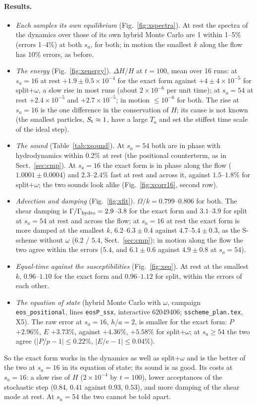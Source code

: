 \documentclass[11pt,aps,preprint,nofootinbib,superscriptaddress,tightenlines]{revtex4-2}
\def\Sect#1{Sect.~\ref{#1}}
\def\Fig#1{Fig.~\ref{#1}}
\let\oldparagraph\paragraph
\renewcommand{\paragraph}{\par\bigskip\oldparagraph}
\begin{document}
\paragraph{Results.}
\begin{itemize}
\item \emph{Each samples its own equilibrium} (\Fig{fig:xspectra}).  At rest the spectra of the dynamics over those of its own hybrid Monte Carlo are 1 within
  1--5\% (errors 1--4\%) at both $s_a$, for both; in motion the smallest $k$ along the flow has 10\% errors, as before.
\item \emph{The energy} (\Fig{fig:xenergy}).  $\Delta H/H$ at $t=100$, mean over 16 runs: at $s_a=16$ at rest $+1.9\pm0.5\times10^{-4}$ for the exact form against
  $+4\pm4\times10^{-5}$ for split$+\omega$, a slow rise in most runs (about $2\times10^{-6}$ per unit time); at $s_a=54$ at rest $+2.4\times10^{-5}$ and
  $+2.7\times10^{-5}$; in motion $\le10^{-6}$ for both.  The rise at $s_a=16$ is the one difference in the conservation of $H$; its cause is not known
  (the smallest particles, $S_{\rm t}\approx1$, have a large $T_a$ and set the stiffest time scale of the ideal step).
\item \emph{The sound} (Table~\ref{tab:xsound}).  At $s_a=54$ both are in phase with hydrodynamics within 0.2\% at rest (the positional counterterm, as in
  \Sect{sec:cmp}).  At $s_a=16$ the exact form is in phase along the flow ($1.0001\pm0.0004$) and $2.3$--$2.4\%$ fast at rest and across it, against
  $1.5$--$1.8\%$ for split$+\omega$; the two sounds look alike (\Fig{fig:xcorr16}, second row).
\item \emph{Advection and damping} (\Fig{fig:xfit}).  $\Omega/k=0.799$--$0.806$ for both.  The shear damping is $\Gamma/\Gamma_{\rm hydro}=2.9$--$3.8$ for the
  exact form and $3.1$--$3.9$ for split at $s_a=54$ at rest and across the flow; at $s_a=16$ at rest the exact form is more damped at the smallest $k$,
  $6.2$--$6.3\pm0.4$ against $4.7$--$5.4\pm0.3$, as the S-scheme without $\omega$ ($6.2$ / $5.4$, \Sect{sec:cmp}); in motion along the flow the two agree within the
  errors ($5.4$, and $6.1\pm0.6$ against $4.9\pm0.8$ at $s_a=54$).
\item \emph{Equal-time against the susceptibilities} (\Fig{fig:xeq}).  At rest at the smallest $k$, $0.96$--$1.10$ for the exact form and $0.96$--$1.12$ for split,
  within the errors of each other.
\item \emph{The equation of state} (hybrid Monte Carlo with $\omega$, campaign \texttt{eos\_positional}, lines \texttt{eosP\_ssx}, interactive 62049406;
  \texttt{sscheme\_plan.tex}, X5).  The raw error at $s_a=16$, $h/a=2$, is smaller for the exact form: $P$ $+2.96\%$, $E$ $+3.73\%$, against $+4.36\%$, $+5.58\%$
  for split$+\omega$; at $s_a\ge54$ the two agree ($|P/p-1|\le0.22\%$, $|E/e-1|\le0.04\%$).
\end{itemize}
So the exact form works in the dynamics as well as split$+\omega$ and is the better of the two at $s_a=16$ in its equation of state; its sound is as good.
Its costs at $s_a=16$: a slow rise of $H$ ($2\times10^{-4}$ by $t=100$), lower acceptances of the stochastic step ($0.84$, $0.41$ against $0.93$, $0.53$), and
more damping of the shear mode at rest.  At $s_a=54$ the two cannot be told apart.
\end{document}
